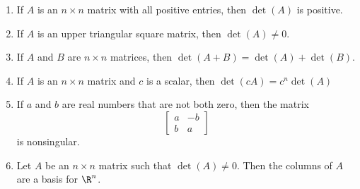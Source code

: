 \documentclass[12pt]{article}
\begin{document}
\begin{enumerate}
\item If $A$ is an $n\times n$ matrix with all positive entries, then $\det(A)$ is positive.

\item If $A$ is an upper triangular square matrix, then $\det(A)\ne0$.

\item If $A$ and $B$ are $n\times n$ matrices, then $\det(A+B)=\det(A)+\det(B)$.

\item If $A$ is an $n\times n$ matrix and $c$ is a scalar, then $\det(cA)=c^n\det(A)$

\item If $a$ and $b$ are real numbers that are not both zero, then the matrix
\[
\begin{bmatrix}a&-b\\b&a\end{bmatrix}
\]
is nonsingular.

\item Let $A$ be an $n\times n$ matrix such that $\det(A)\ne 0$. Then the columns of $A$ are a basis for $\R^n$.


\end{enumerate}
\end{document}

